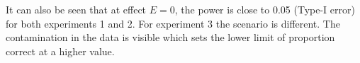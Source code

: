 \documentclass{article}
\begin{document}

It can also be seen that at effect $E=0$, the power is close to 0.05 (Type-I error) for both experiments 1 and 2. For experiment 3 the scenario is different. The contamination in the data is visible which sets the lower limit of proportion correct at a higher value.  



%





\end{document}
